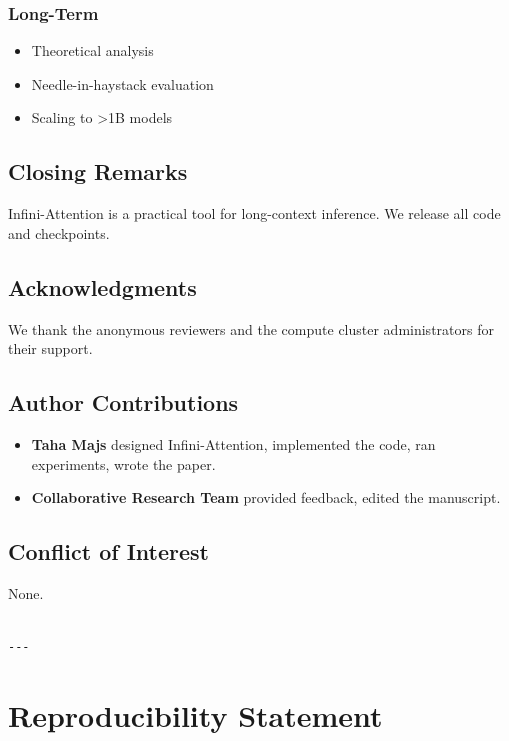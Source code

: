 \subsubsection{Long-Term}
\begin{itemize}
\item Theoretical analysis
\item Needle-in-haystack evaluation
\item Scaling to \textgreater{}1B models

\end{itemize}
\subsection{Closing Remarks}

Infini-Attention is a practical tool for long-context inference. We release 
all code and checkpoints.

\subsection{Acknowledgments}

We thank the anonymous reviewers and the compute cluster administrators for their support.

\subsection{Author Contributions}

\begin{itemize}
\item \textbf{Taha Majs} designed Infini-Attention, implemented the code, ran
  experiments, wrote the paper.
\item \textbf{Collaborative Research Team} provided feedback, edited the manuscript.

\end{itemize}
\subsection{Conflict of Interest}

None.
\begin{lstlisting}

---
\end{lstlisting}


\section{Reproducibility Statement}

